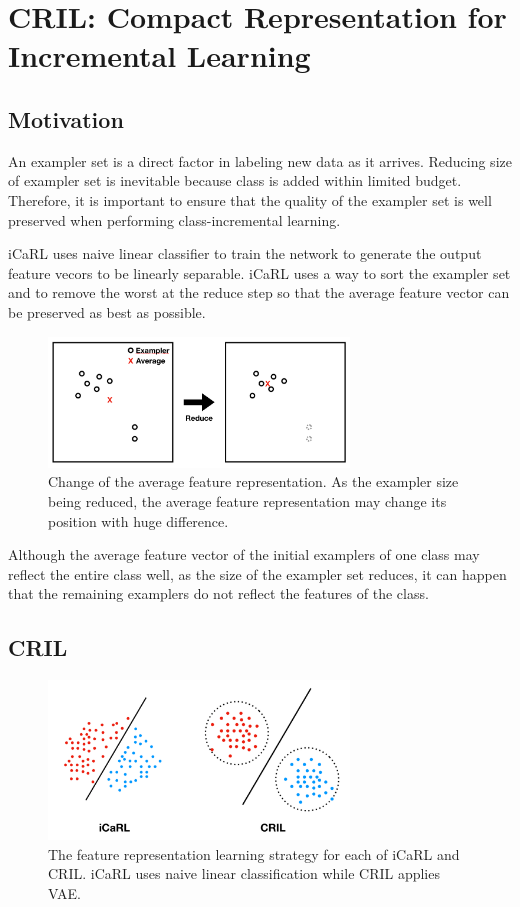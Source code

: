 
\section{CRIL: Compact Representation for Incremental Learning}
\label{sec:cril}

\subsection{Motivation}
\label{sec:motivation}

An exampler set is a direct factor in labeling new data as it arrives. Reducing size of exampler set is inevitable because class is added within limited budget. Therefore, it is important to ensure that the quality of the exampler set is well preserved when performing class-incremental learning.

iCaRL uses naive linear classifier to train the network to generate the output feature vecors to be linearly separable. iCaRL uses a way to sort the exampler set and to remove the worst at the reduce step so that the average feature vector can be preserved as best as possible.

\begin{figure}[h]
\includegraphics[width=80mm]{data/compact_motivation.png}
\centering
\caption{Change of the average feature representation. As the exampler size being reduced, the average feature representation may change its position with huge difference. \label{fig:compact_motivation}}
\end{figure}
Although the average feature vector of the initial examplers of one class may reflect the entire class well, as the size of the exampler set reduces, it can happen that the remaining examplers do not reflect the features of the class.

\subsection{CRIL}

\begin{figure}[h]
\includegraphics[width=80mm]{data/compact_representation.png}
\centering
\caption{The feature representation learning strategy for each of iCaRL and CRIL. iCaRL uses naive linear classification while CRIL applies VAE. \label{fig:compact_representation}}
\end{figure}


